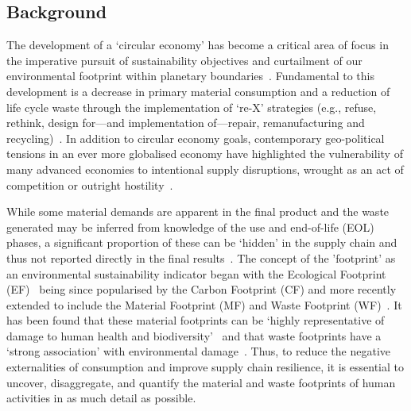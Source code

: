 \subsection{Background}

The development of a `circular economy' has become a critical area of focus in the imperative pursuit of sustainability objectives and curtailment of our environmental footprint within planetary boundaries~\citep{eu2019greendeal, eu2020circ,nl2023ceplan,nl2016ceplan,pardo2018ce,ellenmacarthur2015ce}. Fundamental to this development is a decrease in primary material consumption and a reduction of life cycle waste through the implementation of `re-X' strategies (e.g., refuse, rethink, design for---and implementation of---repair, remanufacturing and recycling)~\citep{eu2022ecodesign, eu2022repair,eu2015reman}. In addition to circular economy goals, contemporary geo-political tensions in an ever more globalised economy have highlighted the vulnerability of many advanced economies to intentional supply disruptions, wrought as an act of competition or outright hostility~\citep{jrc2023supplychain,hartley2024cepolitics,berry2023crm}.

While some material demands are apparent in the final product and the waste generated may be inferred from knowledge of the use and end-of-life (EOL) phases, a significant proportion of these can be `hidden' in the supply chain and thus not reported directly in the final results~\citep{laurenti2016wastefootprint,salviulo2021supplychain}. The concept of the 'footprint' as an environmental sustainability indicator began with the Ecological Footprint (EF)~\citep{wackernagel1994ecologicalfootprint} being since popularised by the Carbon Footprint (CF) and more recently extended to include the Material Footprint (MF) and Waste Footprint (WF)~\cite{cucek2015environmentalfootprints}. It has been found that these material footprints can be `highly representative of damage to human health and biodiversity'~\citep{steinmann2017resourcefootprints} and that waste footprints have a `strong association' with environmental damage~\citep{laurenti2023wastefootprint}. Thus, to reduce the negative externalities of consumption and improve supply chain resilience, it is essential to uncover, disaggregate, and quantify the material and waste footprints of human activities in as much detail as possible.

